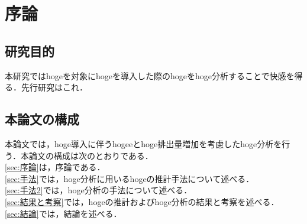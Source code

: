 \documentclass[a4paper,xelatex,ja=standard,hiresbb,12pt]{bxjsarticle}
\begin{document}
    \section{序論\label{sec:序論}}

    \subsection{研究目的}
    本研究ではhogeを対象にhogeを導入した際のhogeをhoge分析することで快感を得る．先行研究はこれ\cite{Hoge2025}．

    \subsection{本論文の構成}
    本論文では，hoge導入に伴うhogeeとhoge排出量増加を考慮したhoge分析を行う．本論文の構成は次のとおりである．\\
    \ref{sec:序論}は，序論である．\\
    \ref{sec:手法}では，hoge分析に用いるhogeの推計手法について述べる．\\
    \ref{sec:手法2}では，hoge分析の手法について述べる．\\
    \ref{sec:結果と考察}では，hogeの推計およびhoge分析の結果と考察を述べる．\\
    \ref{sec:結論}では，結論を述べる．

    \newpage
    
\end{document}
